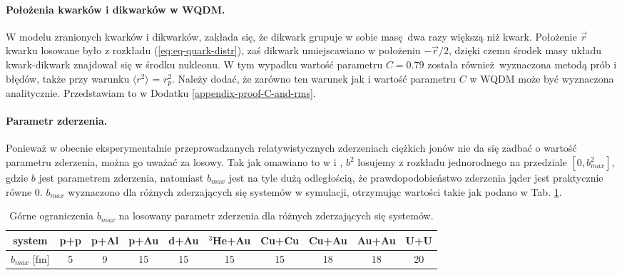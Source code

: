 \documentclass[a4paper,12pt]{article}
\begin{document}
\paragraph{Położenia kwarków i dikwarków w WQDM.}
W modelu zranionych kwarków i dikwarków, zakłada się, że dikwark grupuje w sobie masę dwa razy większą niż kwark. Położenie $\vec{r}$ kwarku losowane było z rozkładu (\ref{eq:eq-quark-distr}), zaś dikwark umiejscawiano w położeniu $-\vec{r}/2$, dzięki czemu środek masy układu kwark-dikwark znajdował się w środku nukleonu. W tym wypadku wartość parametru $C=0.79$ została również wyznaczona metodą prób i błędów, także przy warunku $\langle r^2 \rangle$  = $r_p^2$. Należy dodać, że zarówno ten warunek jak i wartość parametru $C$ w WQDM może być wyznaczona analitycznie. Przedstawiam to w Dodatku \ref{appendix-proof-C-and-rms}.

\paragraph{Parametr zderzenia.}
Ponieważ w obecnie eksperymentalnie przeprowadzanych relatywistycznych zderzeniach ciężkich jonów nie da się zadbać o wartość parametru zderzenia, można go uważać za losowy. Tak jak omawiano to w \cite{Barej:pracaInz18} i \cite{Barej:2017kcw}, $b^2$ losujemy z rozkładu jednorodnego na przedziale $[0, b_{max}^2]$, gdzie $b$ jest parametrem zderzenia, natomiast $b_{max}$ jest na tyle dużą odległością, że prawdopodobieństwo zderzenia jąder jest praktycznie równe 0. $b_{max}$ wyznaczono dla różnych zderzających się systemów w symulacji, otrzymując wartości takie jak podano w Tab. \ref{table:b-max}.

\begin{table}[h!]
\begin{center}
\begin{tabular}{|c|c|c|c|c|c|c|c|c|c|} \hline
system & p+p & p+Al & p+Au & d+Au & $^3$He+Au & Cu+Cu & Cu+Au & Au+Au & U+U \\ \hline
$b_{max}$ [fm] & 5 & 9 & 15 & 15 & 15 & 15 & 18 & 18 & 20  \\ \hline
\end{tabular}
\caption{\label{table:b-max} 
Górne ograniczenia $b_{max}$ na losowany parametr zderzenia dla różnych zderzających się systemów.}
\end{center}
\end{table}
\end{document}
